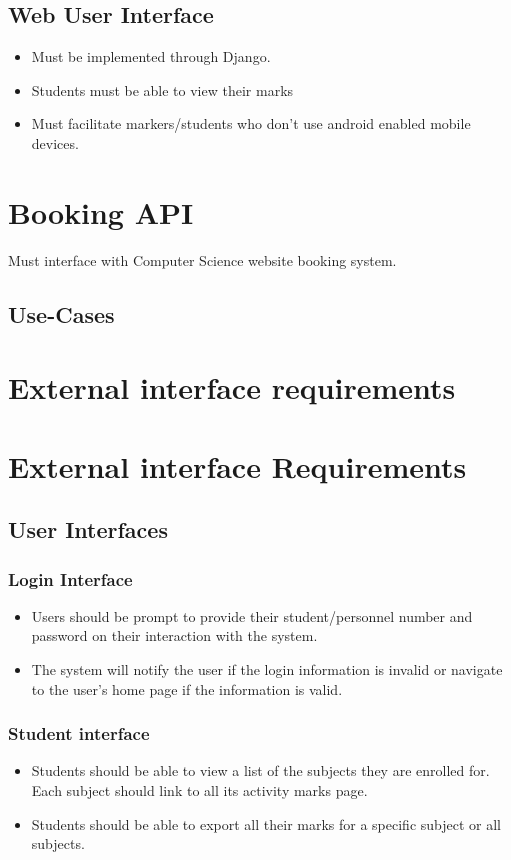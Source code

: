 \documentclass[10pt,a4paper]{article}
\begin{document}
	\subsection*{Web User Interface}
	\begin{itemize}
		\item Must be implemented through Django.
  		\item Students must be able to view their marks
  		\item Must facilitate markers/students who don't use android enabled mobile devices.
	\end{itemize}
	\section*{Booking API}
	Must interface with Computer Science website booking system.
\subsection{Use-Cases}
\section{External interface requirements}
\section{External interface Requirements}
\label{External interface Requirements}


\subsection{User Interfaces}
\label{User Interfaces}


\subsubsection{Login Interface}
\label{Login Interface}
\begin{itemize}
\item Users should be prompt to provide their student/personnel number and password on their interaction with the system.	
\item The system will notify the user if the login information is invalid or navigate to the user's home page if the information is valid.
\end{itemize}
\subsubsection{Student interface}
\label{Student interface}
\begin{itemize}
\item Students should be able to view a list of the subjects they are enrolled for. Each subject should link to all its activity marks page.
\item Students should be able to export all their marks for a specific subject or all subjects.
\end{itemize}
\end{document}
